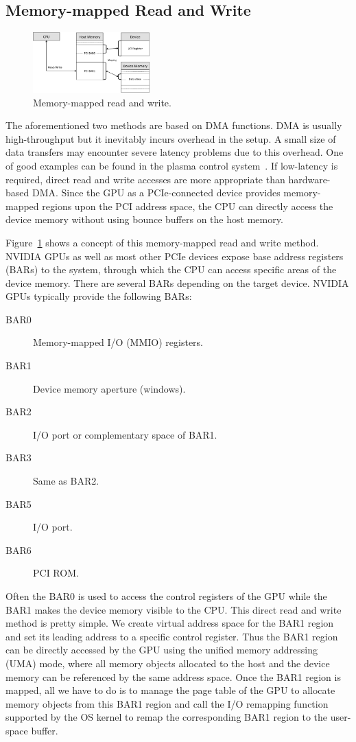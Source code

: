 \subsection{Memory-mapped Read and Write}
\label{sec:iorw}

\begin{figure}[!t]
 \centering
 \includegraphics[width=0.4\textwidth]{figure/Method/IORW_Method.pdf}
 \caption{Memory-mapped read and write.}
 \label{fig:iorw}
\end{figure}

The aforementioned two methods are based on DMA functions.
DMA is usually high-throughput but it inevitably incurs overhead in the
setup.
A small size of data transfers may encounter severe latency problems due
to this overhead.
One of good examples can be found in the plasma control
system~\cite{Kato_ICCPS13}.
If low-latency is required, direct read and write accesses are more
appropriate than hardware-based DMA.
Since the GPU as a PCIe-connected device provides memory-mapped regions
upon the PCI address space, the CPU can directly access the device
memory without using bounce buffers on the host memory.

Figure~\ref{fig:iorw} shows a concept of this memory-mapped read and
write method.
NVIDIA GPUs as well as most other PCIe devices expose base address
registers (BARs) to the system, through which the CPU can access
specific areas of the device memory.
There are several BARs depending on the target device.
NVIDIA GPUs typically provide the following BARs:
\begin{description}
 \item[BAR0] Memory-mapped I/O (MMIO) registers.
 \item[BAR1] Device memory aperture (windows).
 \item[BAR2] I/O port or complementary space of BAR1.
 \item[BAR3] Same as BAR2.
 \item[BAR5] I/O port.
 \item[BAR6] PCI ROM.
\end{description}

Often the BAR0 is used to access the control registers of the GPU while
the BAR1 makes the device memory visible to the CPU.
This direct read and write method is pretty simple.
We create virtual address space for the BAR1 region and set its leading
address to a specific control register.
Thus the BAR1 region can be directly accessed by the GPU using the
unified memory addressing (UMA) mode, where all memory objects allocated
to the host and the device memory can be referenced by the same address
space.
Once the BAR1 region is mapped, all we have to do is to manage the page
table of the GPU to allocate memory objects from this BAR1 region and
call the I/O remapping function supported by the OS kernel to remap the
corresponding BAR1 region to the user-space buffer.

